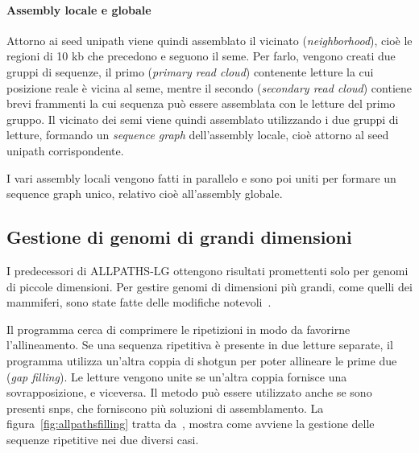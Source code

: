 \documentclass[crop=false, class=book]{standalone}
\begin{document}
	\paragraph{Assembly locale e globale}
	Attorno ai seed unipath viene quindi assemblato il vicinato (\textit{neighborhood}), cioè le regioni di 10 kb che precedono e seguono il seme. Per farlo, vengono creati due gruppi di sequenze, il primo (\textit{primary read cloud}) contenente letture la cui posizione reale è vicina al seme, mentre il secondo (\textit{secondary read cloud}) contiene brevi frammenti la cui sequenza può essere assemblata con le letture del primo gruppo. Il vicinato dei semi viene quindi assemblato utilizzando i due gruppi di letture, formando un \textit{sequence graph} dell'assembly locale, cioè attorno al seed unipath corrispondente.
	
	I vari assembly locali vengono fatti in parallelo e sono poi uniti per formare un sequence graph unico, relativo cioè all'assembly globale.
	
	
	\subsection{Gestione di genomi di grandi dimensioni}
	I predecessori di ALLPATHS-LG ottengono risultati promettenti solo per genomi di piccole dimensioni. Per gestire genomi di dimensioni più grandi, come quelli dei mammiferi, sono state fatte delle modifiche notevoli~\cite{gnerre2011high}.

	Il programma cerca di comprimere le ripetizioni in modo da favorirne l'allineamento. Se una sequenza ripetitiva è presente in due letture separate, il programma utilizza un'altra coppia di shotgun per poter allineare le prime due (\textit{gap filling}). Le letture vengono unite se un'altra coppia fornisce una sovrapposizione, e viceversa. Il metodo può essere utilizzato anche se sono presenti \glspl{snp}, che forniscono più soluzioni di assemblamento. La figura~\vref{fig:allpathsfilling} tratta da~\cite{gnerre2011high}, mostra come avviene la gestione delle sequenze ripetitive nei due diversi casi.
\end{document}
